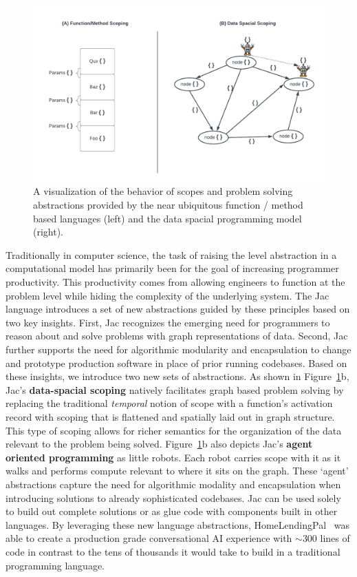 \begin{figure}[tb]
    \centering
    \includegraphics[width=\linewidth]{figures/data_spacial.pdf}
    \caption{A visualization of the behavior of scopes and problem solving abstractions provided by the near ubiquitous function / method based languages (left) and the data spacial programming model (right).}
    \label{fig:benefit}
\end{figure}

Traditionally in computer science, the task of raising the level abstraction in a computational model has primarily been for the goal of increasing programmer productivity.
This productivity comes from allowing engineers to function at the problem level while hiding the complexity of the underlying system.
The Jac language introduces a set of new abstractions guided by these principles based on two key insights.
First, Jac recognizes the emerging need for programmers to reason about and solve problems with graph representations of data.
Second, Jac further supports the need for algorithmic modularity and encapsulation to change and prototype production software in place of prior running codebases.
Based on these insights, we introduce two new sets of abstractions.
As shown in Figure~\ref{fig:benefit}b, Jac's \textbf{data-spacial scoping} natively facilitates graph based problem solving by replacing the traditional \emph{temporal} notion of scope with a function's activation record with scoping that is flattened and spatially laid out in graph structure.
This type of scoping allows for richer semantics for the organization of the data relevant to the problem being solved.
Figure~\ref{fig:benefit}b also depicts Jac's \textbf{agent oriented programming} as little robots.
Each robot carries scope with it as it walks and performs compute relevant to where it sits on the graph.
These `agent' abstractions capture the need for algorithmic modality and encapsulation when introducing solutions to already sophisticated codebases.
Jac can be used solely to build out complete solutions or as glue code with components built in other languages.
By leveraging these new language abstractions, HomeLendingPal~\cite{hlp-website} was able to create a production grade conversational AI experience with $\sim$300 lines of code in contrast to the tens of thousands it would take to build in a traditional programming language.